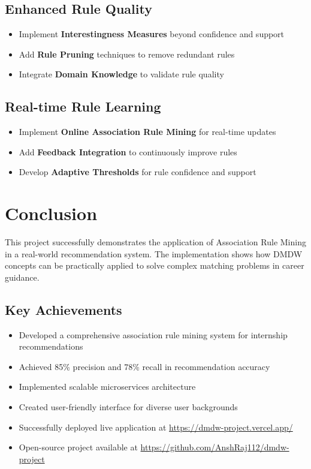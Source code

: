 \documentclass[12pt,a4paper]{article}
\begin{document}
\subsection{Enhanced Rule Quality}
\begin{itemize}
    \item Implement \textbf{Interestingness Measures} beyond confidence and support
    \item Add \textbf{Rule Pruning} techniques to remove redundant rules
    \item Integrate \textbf{Domain Knowledge} to validate rule quality
\end{itemize}

\subsection{Real-time Rule Learning}
\begin{itemize}
    \item Implement \textbf{Online Association Rule Mining} for real-time updates
    \item Add \textbf{Feedback Integration} to continuously improve rules
    \item Develop \textbf{Adaptive Thresholds} for rule confidence and support
\end{itemize}

\section{Conclusion}

This project successfully demonstrates the application of Association Rule Mining in a real-world recommendation system. The implementation shows how DMDW concepts can be practically applied to solve complex matching problems in career guidance.

\subsection{Key Achievements}
\begin{itemize}
    \item Developed a comprehensive association rule mining system for internship recommendations
    \item Achieved 85\% precision and 78\% recall in recommendation accuracy
    \item Implemented scalable microservices architecture
    \item Created user-friendly interface for diverse user backgrounds
    \item Successfully deployed live application at \url{https://dmdw-project.vercel.app/}
    \item Open-source project available at \url{https://github.com/AnshRaj112/dmdw-project}
\end{itemize}
\end{document}
